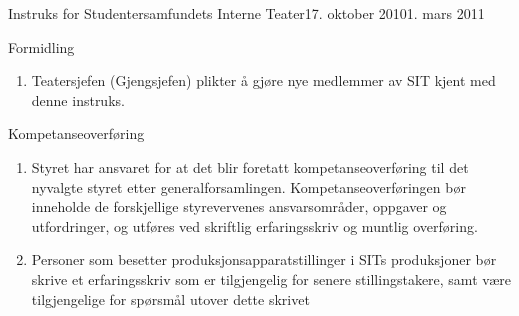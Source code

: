 \begin{instruks}{Instruks for Studentersamfundets Interne Teater}{17. oktober 2010}{1. mars 2011 }
	\begin{instruksledd}{Formidling}
		\begin{enumerate}
			\item Teatersjefen (Gjengsjefen) plikter å gjøre nye medlemmer av SIT kjent med
				denne instruks.
		\end{enumerate}
	\end{instruksledd}

	\begin{instruksledd}{Kompetanseoverføring}
		\begin{enumerate}
			\item Styret har ansvaret for at det blir foretatt kompetanseoverføring til det
				nyvalgte styret etter generalforsamlingen. Kompetanseoverføringen bør inneholde de forskjellige
				styrevervenes ansvarsområder, oppgaver og utfordringer, og utføres ved skriftlig erfaringsskriv og
				muntlig overføring.
			\item Personer som besetter produksjonsapparatstillinger i SITs produksjoner bør
				skrive et erfaringsskriv som er tilgjengelig for senere stillingstakere, samt være tilgjengelige for
				spørsmål utover dette skrivet	
		\end{enumerate}
	\end{instruksledd}


\end{instruks}


